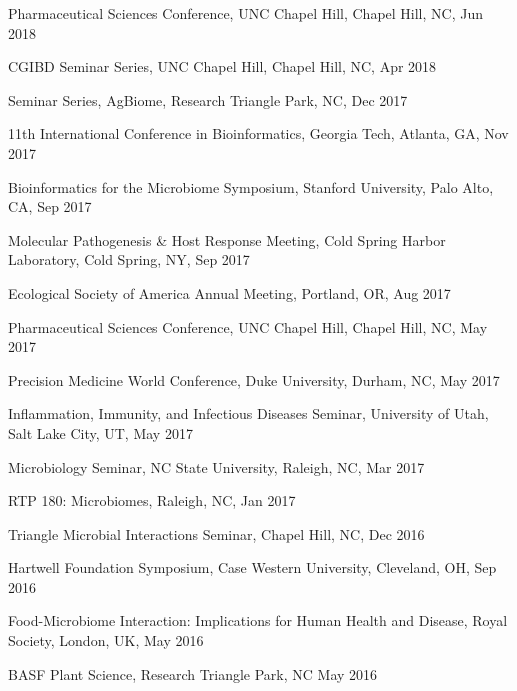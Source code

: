 \documentclass[overlapped,line,11pt]{res}
\begin{document}
\begin{resume}
\begin{revnumerate}[62]
\item {Pharmaceutical Sciences Conference, UNC Chapel Hill, Chapel Hill, NC, Jun 2018}

\item {CGIBD Seminar Series, UNC Chapel Hill, Chapel Hill, NC, Apr 2018}

\item {Seminar Series, AgBiome, Research Triangle Park, NC, Dec 2017}

\item {11th International Conference in Bioinformatics, Georgia Tech, Atlanta, GA, Nov 2017}

\item {Bioinformatics for the Microbiome Symposium, Stanford University, Palo Alto, CA, Sep 2017}

\item {Molecular Pathogenesis \& Host Response Meeting, Cold Spring Harbor Laboratory, Cold Spring, NY, Sep 2017}

\item {Ecological Society of America Annual Meeting, Portland, OR, Aug 2017}

\item {Pharmaceutical Sciences Conference, UNC Chapel Hill, Chapel Hill, NC, May 2017}

\item {Precision Medicine World Conference, Duke University, Durham, NC, May 2017}

\item {Inflammation, Immunity, and Infectious Diseases Seminar, University of Utah, Salt Lake City, UT, May 2017}

\item {Microbiology Seminar, NC State University, Raleigh, NC, Mar 2017}

\item {RTP 180: Microbiomes, Raleigh, NC, Jan 2017}

\item {Triangle Microbial Interactions Seminar, Chapel Hill, NC, Dec 2016}

\item {Hartwell Foundation Symposium, Case Western University, Cleveland, OH, Sep 2016}

\item {Food-Microbiome Interaction: Implications for Human Health and Disease, Royal Society, London, UK, May 2016}

\item {BASF Plant Science, Research Triangle Park, NC May 2016}


\end{revnumerate}
\end{resume}
\end{document}
